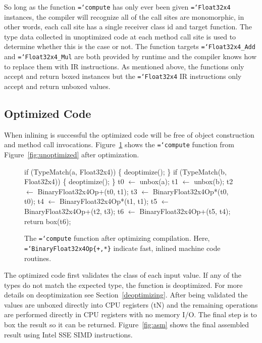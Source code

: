 \documentclass[preprint]{sigplanconf}
\newcommand{\ttt}[1]{{\texttt{\hyphenchar\font=`\-\relax #1}}}%
\begin{document}
So long as the function \ttt{compute} has only ever been given \ttt{Float32x4}
instances, the compiler will recognize all of the call sites are monomorphic, in
other words, each call site has a single receiver class id and target function.
The type data collected in unoptimized code at each method call site is used to
determine whether this is the case or not. The function targets
\ttt{Float32x4\_Add} and \ttt{Float32x4\_Mul} are both provided by runtime and
the compiler knows how to replace them with IR instructions. As mentioned above,
the functions only accept and return boxed instances but the \ttt{Float32x4} IR
instructions only accept and return unboxed values.

\subsection{Optimized Code}

When inlining is successful the optimized code will be free of object
construction and method call invocations. Figure~\ref{fig:optimized} shows
the \ttt{compute} function from Figure~\ref{fig:unoptimized} after optimization.

\begin{figure}
\begin{small}
\begin{program}[style=tt, number=true]
if\tab{} (\!TypeMatch(a, Float32x4)) \{
  deoptimize();\untab{}
\}
if\tab{} (\!TypeMatch(b, Float32x4)) \{
  deoptimize();\untab{}
\}
t0 $\leftarrow$ unbox(a);
t1 $\leftarrow$ unbox(b);
t2 $\leftarrow$ BinaryFloat32x4Op+(t0, t1);
t3 $\leftarrow$ BinaryFloat32x4Op*(t0, t0);
t4 $\leftarrow$ BinaryFloat32x4Op*(t1, t1);
t5 $\leftarrow$ BinaryFloat32x4Op+(t2, t3);
t6 $\leftarrow$ BinaryFloat32x4Op+(t5, t4);
return box(t6);
\end{program}
\end{small}
\caption{The \ttt{compute} function after optimizing compilation. Here,
\ttt{BinaryFloat32x4Op\{+,*\}} indicate fast, inlined machine code routines.}
\label{fig:optimized}
\end{figure}

The optimized code first validates the class of each input value. If any of the
types do not match the expected type, the function is deoptimized. For more
details on deoptimization see Section~\ref{deoptimizing}. After being validated
the values are unboxed directly into CPU registers (tN) and the remaining
operations are performed directly in CPU registers with no memory I/O. The final
step is to box the result so it can be returned. Figure~\ref{fig:asm} shows the
final assembled result using Intel SSE SIMD instructions.
\end{document}

